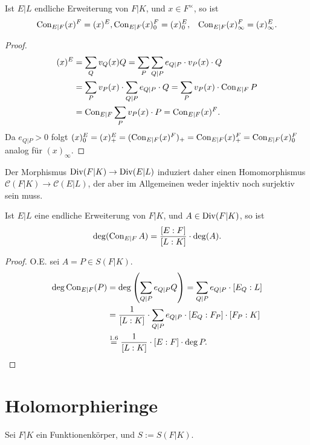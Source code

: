 \begin{lemma}
    Ist $E|L$ endliche Erweiterung von $F|K$, und $x \in F^\times$, so ist
    \begin{align*}
        \operatorname{Con}_{E|F}(x)^F = (x)^E,& \operatorname{Con}_{E|F} (x)_0^F = (x)_0^E,& \operatorname{Con}_{E|F} (x)_\infty^F = (x)_\infty^E.
    \end{align*}
\end{lemma}
\begin{proof}
    \begin{align*}
        (x)^E & = \sum\limits_Q v_Q(x) Q = \sum\limits_P \sum\limits_{Q|P} e_{Q|P} \cdot v_P(x) \cdot Q\\
        & = \sum\limits_P v_P(x) \cdot \sum\limits_{Q|P} e_{Q|P} \cdot Q = \sum\limits_P v_P(x) \cdot \operatorname{Con}_{E|F} P\\
        & = \operatorname{Con}_{E|F} \sum\limits_P v_P(x) \cdot P = \operatorname{Con}_{E|F} (x)^F.
    \end{align*}
    Da $e_{Q|P} > 0$ folgt $(x)^E_0 = (x)^E_+ = (\operatorname{Con}_{E|F} (x)^F)_+ = \operatorname{Con}_{E|F} (x)^F_+ = \operatorname{Con}_{E|F}(x)^F_0$
    analog für $(x)_\infty$.

\end{proof}

\begin{bemerkungnr}
    Der Morphismus $\operatorname{Div}(F|K) \to \operatorname{Div}(E|L)$ induziert daher einen Homomorphismus
    $\mathscr{C}(F|K) \to \mathscr{C}(E|L)$, der aber im Allgemeinen weder injektiv noch surjektiv sein muss. 
\end{bemerkungnr}

\begin{satz}
    Ist $E|L$ eine endliche Erweiterung von $F|K$, und $A \in \operatorname{Div}(F|K)$, so ist
    $$ \deg (\operatorname{Con}_{E|F}A ) = \frac{[E:F]}{[L:K]} \cdot \deg (A). $$
\end{satz}
\begin{proof}
    O.E. sei $A = P \in S(F|K)$.
    \begin{align*}
        \deg \operatorname{Con}_{E|F}(P) & = \deg \left( \sum\limits_{Q|P} e_{Q|P}Q\right) = \sum\limits_{Q|P}e_{Q|P}\cdot [E_Q:L]\\
        & = \frac{1}{[L:K]}\cdot \sum\limits_{Q|P} e_{Q|P} \cdot [E_Q: F_P] \cdot [F_P : K]\\
        & \overset{1.6}{=} \frac{1}{[L:K]} \cdot [E:F] \cdot \deg P.
    \end{align*}
\end{proof}

\section{Holomorphieringe}
Sei $F|K$ ein Funktionenkörper, und $S := S(F|K)$.

